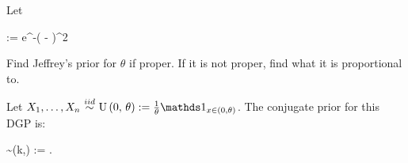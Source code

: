 \documentclass[12pt]{article}
\begin{document}
\problem Let 

\beqn
\Xoneton \iid {}\normnot{\theta}{\sigsq} :=  e^{-\oneover{2\sigsq}( - \theta)^2}  ~~~\sigsq~
\eeqn 




\begin{enumerate}[(a)]

 Find Jeffrey's prior for $\theta$ if proper. If it is not proper, find what it is proportional to.

\iftoggle{solutions}{\inred{
\beqn
\mathcal{L}(\theta\,;\,\x,\sigsq) &=& \prod_{i=1}^n \oneover{\sqrt{2\pi \sigsq x_i^2}} e^{-\oneover{2\sigsq}(\natlog{x} - \theta)^2} \indic{x_i > 0} \\
\ell(\theta\,;\,\x,\sigsq) &=& -\frac{n}{2}\natlog{2\pi \sigsq } - \sum_{i=1}^n \natlog{x_i} - \oneover{2\sigsq} \parens{\sum_{i=1}^n (\natlog{x_i} -\theta)^2} + \natlog{\prod_{i=1}^n \indic{x_i > 0}} \\
\ell'(\theta\,;\,\x,\sigsq) &=& - \oneover{2\sigsq}\frac{d}{d\theta}\bracks{\sum_{i=1}^n \natlog{x_i}^2 - 2\theta \sum_{i=1}^n \natlog{x_i} + n\theta^2}\\
\ell'(\theta\,;\,\x,\sigsq) &=& \frac{\sum_{i=1}^n \natlog{x_i}}{\sigsq} - \frac{n\theta}{\sigsq} \\
\ell''(\theta\,;\,\x,\sigsq) &=& - \frac{n}{\sigsq} \\
I(\theta) &=& \expe{-\ell''(\theta\,;\,\x,\sigsq)} = \frac{n}{\sigsq} \\
f_J(\theta) &\propto& \sqrt{I(\theta)} = \sqrt{\frac{n}{\sigsq}} \propto 1
\eeqn
}}{~\spc{30}} \pagebreak


\end{enumerate}



\problem Let $\Xoneton \iid \uniform{0}{\theta} := \oneover{\theta} \indic{x \in (0, \theta)}$. The conjugate prior for this DGP is:

\beqn
\theta \sim {}(k,\lambda) := \displaystyle{}.
\eeqn
\end{document}

